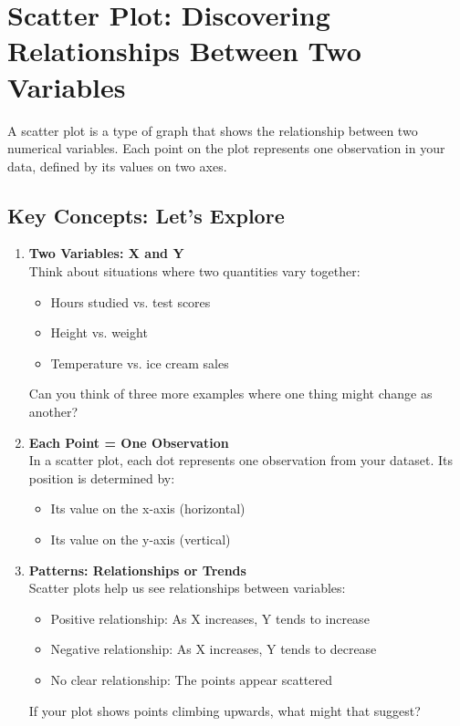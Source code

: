 \section{Scatter Plot: Discovering Relationships Between Two Variables}

A scatter plot is a type of graph that shows the relationship between two numerical variables. Each point on the plot represents one observation in your data, defined by its values on two axes.

\subsection*{Key Concepts: Let’s Explore}

\begin{enumerate}
    \item \textbf{Two Variables: X and Y} \\
    Think about situations where two quantities vary together:
    \begin{itemize}
        \item Hours studied vs. test scores
        \item Height vs. weight
        \item Temperature vs. ice cream sales
    \end{itemize}
    Can you think of three more examples where one thing might change as another?

    \item \textbf{Each Point = One Observation} \\
    In a scatter plot, each dot represents one observation from your dataset. Its position is determined by:
    \begin{itemize}
        \item Its value on the x-axis (horizontal)
        \item Its value on the y-axis (vertical)
    \end{itemize}

    \item \textbf{Patterns: Relationships or Trends} \\
    Scatter plots help us see relationships between variables:
    \begin{itemize}
        \item Positive relationship: As X increases, Y tends to increase
        \item Negative relationship: As X increases, Y tends to decrease
        \item No clear relationship: The points appear scattered
    \end{itemize}
    If your plot shows points climbing upwards, what might that suggest?


\end{enumerate}
